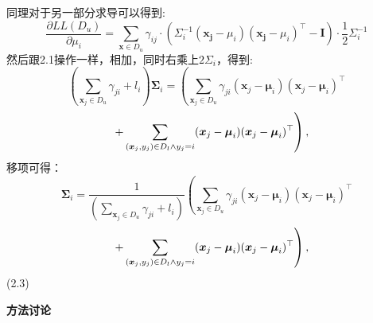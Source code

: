 \documentclass[answers]{exam}  %
\begin{document}
\begin{questions}
\begin{solution}
\begin{parts}
\[    \]
    同理对于另一部分求导可以得到:\\
    \[
        \frac{\partial LL(D_u)}{\partial \mu_i} = \sum_{\boldsymbol{x}\in D_u} \gamma_{ij} \cdot(\Sigma_i^{-1}(\boldsymbol{x_j} - \mu_i)(\boldsymbol{x_j} - \mu_i)^\top - \boldsymbol{I})\cdot\frac{1}{2}\Sigma_i^{-1}
    \]
    然后跟2.1操作一样，相加，同时右乘上$2\Sigma_i$，得到:
    \[
        (\sum_{\boldsymbol{x}_j \in D_u} \gamma_{ji} + l_i)\boldsymbol{\Sigma}_i = \left( \sum_{\boldsymbol{x}_j \in D_u} \gamma_{ji} (\boldsymbol{x}_j - \boldsymbol{\mu}_i)(\boldsymbol{x}_j - \boldsymbol{\mu}_i)^\top \right.
    \]
    \[
        \quad \left. + \sum_{(\boldsymbol{x}_j, y_j) \in D_l \land y_j = i} (\boldsymbol{x}_j - \boldsymbol{\mu}_i)(\boldsymbol{x}_j - \boldsymbol{\mu}_i)^\top \right) , \\
    \]
    移项可得：
    \[
        \boldsymbol{\Sigma}_i = \frac{1}{(\sum_{\boldsymbol{x}_j \in D_u} \gamma_{ji} + l_i)}\left( \sum_{\boldsymbol{x}_j \in D_u} \gamma_{ji} (\boldsymbol{x}_j - \boldsymbol{\mu}_i)(\boldsymbol{x}_j - \boldsymbol{\mu}_i)^\top \right.
    \]
    \[
        \quad \left. + \sum_{(\boldsymbol{x}_j, y_j) \in D_l \land y_j = i} (\boldsymbol{x}_j - \boldsymbol{\mu}_i)(\boldsymbol{x}_j - \boldsymbol{\mu}_i)^\top \right) , \\
    \]
    (2.3)

\end{parts}
\end{solution}

\question [30] \textbf{方法讨论}


\end{questions}
\end{document}
